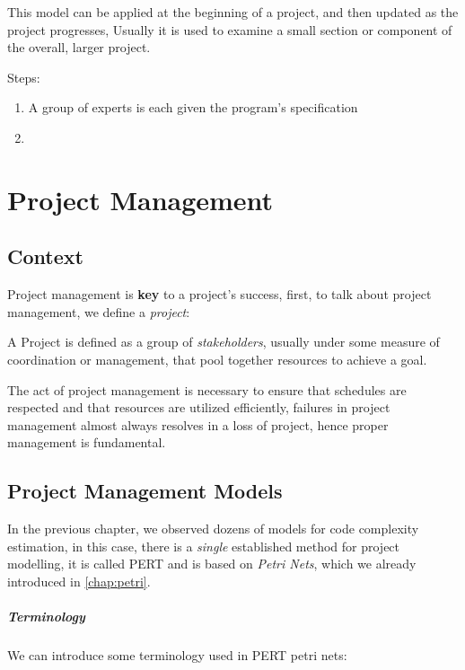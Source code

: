 \documentclass[openright, twoside, twocolumn]{report}
\begin{document}
This model can be applied at the beginning of a project, and then updated as the project progresses,
Usually it is used to examine a small section or component of the overall, larger project.

Steps:

\begin{enumerate}
  \item A group of experts is each given the program's specification
  \item %
\end{enumerate}

\chapter{Project Management}

\section{Context}

Project management is \textbf{key} to a project's success, first, to talk
about project management, we define a \emph{project}:

\begin{definition}[Project]
  A Project is defined as a group of \emph{stakeholders}, usually
  under some measure of coordination or management, that pool
  together resources to achieve a goal.
\end{definition}

The act of project management is necessary to ensure that schedules are respected
and that resources are utilized efficiently, failures in project management
almost always resolves in a loss of project, hence proper management is fundamental.

\section{Project Management Models}

In the previous chapter, we observed dozens of models for code complexity
estimation, in this case, there is a \emph{single} established method
for project modelling, it is called PERT and is based on \emph{Petri Nets},
which we already introduced in \cref{chap:petri}.

\paragraph{Terminology}
We can introduce some terminology used in PERT petri nets:
\end{document}
